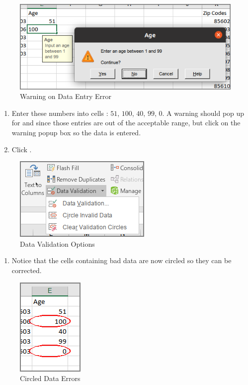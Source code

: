 \begin{figure}[H]
	\centering
	\includegraphics[width=\maxwidth{.95\linewidth}]{gfx/ch07_fig41}
	\caption{Warning on Data Entry Error}
	\label{07:fig41}
\end{figure}

\begin{enumerate}[resume]	
	\item Enter these numbers into cells : $ 51 $, $ 100 $, $ 40 $, $ 99 $, $ 0 $. A warning should pop up for  and  since those entries are out of the acceptable range, but click  on the warning popup box so the data is entered.
	\item Click .
\end{enumerate}

\begin{figure}[H]
	\centering
	\includegraphics[width=\maxwidth{.95\linewidth}]{gfx/ch07_fig42}
	\caption{Data Validation Options}
	\label{07:fig42}
\end{figure}

\begin{enumerate}[resume]	
	\item Notice that the cells containing bad data are now circled so they can be corrected.
\end{enumerate}

\begin{figure}[H]
	\centering
	\includegraphics[width=\maxwidth{.95\linewidth}]{gfx/ch07_fig43}
	\caption{Circled Data Errors}
	\label{07:fig43}
\end{figure}

